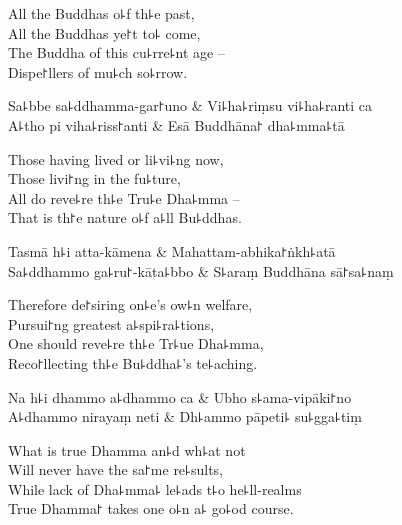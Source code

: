 \begin{english}
  All the Buddhas o꜕f th꜕e past,\\
  All the Buddhas ye꜓t to꜕ come,\\
  The Buddha of this cu꜕rre꜕nt age --\\
  Dispe꜓llers of mu꜕ch so꜕rrow.
\end{english}

\begin{twochants}
  Sa꜕bbe sa꜕ddhamma-gar꜓uno & Vi꜕ha꜕riṃsu vi꜕ha꜕ranti ca \\
  A꜕tho pi viha꜕riss꜓anti & Esā Buddhāna꜓ dha꜕mma꜕tā \\
\end{twochants}

\begin{english}
  Those having lived or li꜕vi꜕ng now,\\
  Those livi꜓ng in the fu꜕ture,\\
  All do reve꜕re th꜕e Tru꜕e Dha꜕mma --\\
  That is th꜓e nature o꜕f a꜕ll Bu꜕ddhas.
\end{english}

\begin{twochants}
  Tasmā h꜕i atta-kāmena & Mahattam-abhika꜓ṅkh꜕atā \\
  Sa꜕ddhammo ga꜕ru꜓-kāta꜕bbo & S꜕araṃ Buddhāna sā꜓sa꜕naṃ \\
\end{twochants}

\begin{english}
  Therefore de꜓siring on꜕e's ow꜕n welfare,\\
  Pursui꜓ng greatest a꜕spi꜕ra꜕tions,\\
  One should reve꜕re th꜕e Tr꜕ue Dha꜕mma,\\
  Reco꜓llecting th꜕e Bu꜕ddha꜕'s te꜕aching.
\end{english}

\begin{twochants}
  Na h꜕i dhammo a꜕dhammo ca & Ubho s꜕ama-vipāki꜓no \\
  A꜕dhammo nirayaṃ neti & Dh꜕ammo pāpeti꜕ su꜕gga꜕tiṃ \\
\end{twochants}

\begin{english}
  What is true Dhamma an꜕d wh꜕at not\\
  Will never have the sa꜓me re꜕sults,\\
  While lack of Dha꜕mma꜕ le꜕ads t꜕o he꜕ll-realms\\
  True Dhamma꜓ takes one o꜕n a꜕ go꜕od course.
\end{english}

